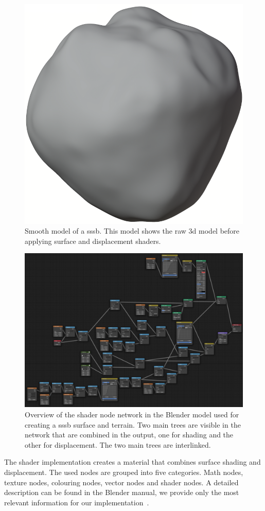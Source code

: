 \begin{figure}[htb]
    \centering
    \includegraphics[width=.4\textwidth]{doc/thesis/0_figures/procedural_terrain/smooth_model.png}
    \caption{Smooth model of a \gls{sssb}. This model shows the raw \gls{3d} model before applying surface and displacement shaders.}
    \label{fig:smooth_model}
\end{figure}

\begin{figure}[htb]
    \centering
    \includegraphics[width=\textwidth]{doc/thesis/0_figures/procedural_terrain/node_network.png}
    \caption{Overview of the shader node network in the Blender model used for creating a \gls{sssb} surface and terrain. Two main trees are visible in the network that are combined in the output, one for shading and the other for displacement. The two main trees are interlinked.}
    \label{fig:shader_nodes}
\end{figure}

The shader implementation creates a material that combines surface shading and displacement. The used nodes are grouped into five categories. Math nodes, texture nodes, colouring nodes, vector nodes and shader nodes. A detailed description can be found in the Blender manual, we provide only the most relevant information for our implementation~\cite{IntroductionManual}.

